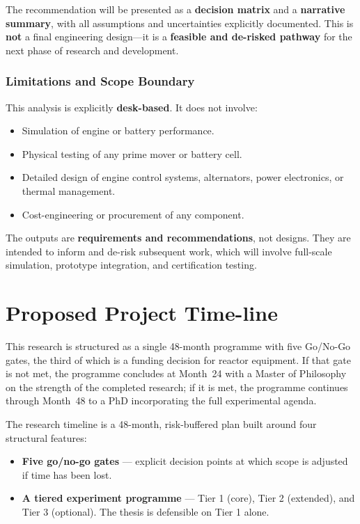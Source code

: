 \documentclass[12pt]{article}
\begin{document}
The recommendation will be presented as a \textbf{decision matrix} and a \textbf{narrative summary}, with all assumptions and uncertainties explicitly documented. This is \textbf{not} a final engineering design—it is a \textbf{feasible and de-risked pathway} for the next phase of research and development.

\subsubsection*{Limitations and Scope Boundary}

This analysis is explicitly \textbf{desk-based}. It does not involve:
\begin{itemize}
    \item Simulation of engine or battery performance.
    \item Physical testing of any prime mover or battery cell.
    \item Detailed design of engine control systems, alternators, power electronics, or thermal management.
    \item Cost-engineering or procurement of any component.
\end{itemize}

The outputs are \textbf{requirements and recommendations}, not designs. They are intended to inform and de-risk subsequent work, which will involve full-scale simulation, prototype integration, and certification testing.

\break

\section{Proposed Project Time-line}
\label{sec:project-timeline}

This research is structured as a single 48-month programme with five
Go/No-Go gates, the third of which is a funding decision for reactor
equipment. If that gate is not met, the programme concludes at
Month~24 with a Master of Philosophy on the strength of the completed
research; if it is met, the programme continues through Month~48 to a
PhD incorporating the full experimental agenda.

The research timeline is a 48-month, risk-buffered plan built around four
structural features:

\begin{itemize}
    \item \textbf{Five go/no-go gates} --- explicit decision points at which scope is adjusted
          if time has been lost.
    \item \textbf{A tiered experiment programme} --- Tier 1 (core), Tier 2 (extended), and
          Tier 3 (optional). The thesis is defensible on Tier 1 alone.
\end{itemize}
\end{document}
